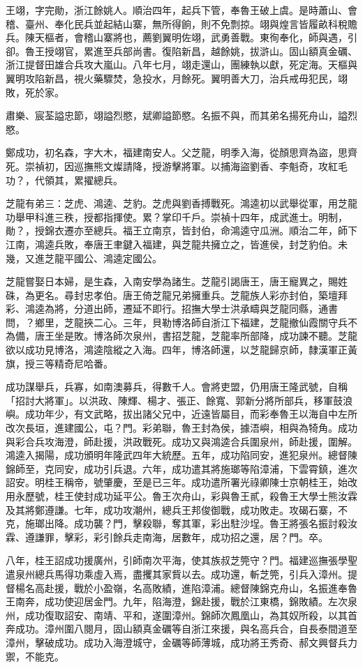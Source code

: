 \begin{pinyinscope}
王翊，字完勛，浙江餘姚人。順治四年，起兵下管，奉魯王破上虞。是時蕭山、會稽、臺州、奉化民兵並起結山寨，無所得餉，則不免剽掠。翊與煌言皆履畝科稅贍兵。陳天樞者，會稽山寨將也，薦劉翼明佐翊，武勇善戰。東徇奉化，師與遇，引卻。魯王授翊官，累進至兵部尚書。復陷新昌，越餘姚，拔滸山。固山額真金礪、浙江提督田雄合兵攻大嵐山。八年七月，翊走還山，團練執以獻，死定海。天樞與翼明攻陷新昌，視火藥驟焚，急投水，月餘死。翼明善大刀，治兵戒毋犯民，翊敗，死於家。

肅樂、宸荃謚忠節，翊謚烈愍，斌卿謚節愍。名振不與，而其弟名揚死舟山，謚烈愍。

鄭成功，初名森，字大木，福建南安人。父芝龍，明季入海，從顏思齊為盜，思齊死。崇禎初，因巡撫熊文燦請降，授游擊將軍。以捕海盜劉香、李魁奇，攻紅毛功？，代領其，累擢總兵。

芝龍有弟三：芝虎、鴻逵、芝豹。芝虎與劉香搏戰死。鴻逵初以武舉從軍，用芝龍功舉甲科進三秩，授都指揮使。累？掌印千戶。崇禎十四年，成武進士。明制，勛？，授錦衣遷亦至總兵。福王立南京，皆封伯，命鴻逵守瓜洲。順治二年，師下江南，鴻逵兵敗，奉唐王聿鍵入福建，與芝龍共擁立之，皆進侯，封芝豹伯。未幾，又進芝龍平國公、鴻逵定國公。

芝龍嘗娶日本婦，是生森，入南安學為諸生。芝龍引謁唐王，唐王寵異之，賜姓硃，為更名。尋封忠孝伯。唐王倚芝龍兄弟擁重兵。芝龍族人彩亦封伯，築壇拜彩、鴻逵為將，分道出師，遷延不即行。招撫大學士洪承疇與芝龍同縣，通書問，？鄉里，芝龍挾二心。三年，貝勒博洛師自浙江下福建，芝龍撤仙霞關守兵不為備，唐王坐是敗。博洛師次泉州，書招芝龍，芝龍率所部降，成功諫不聽。芝龍欲以成功見博洛，鴻逵陰縱之入海。四年，博洛師還，以芝龍歸京師，隸漢軍正黃旗，授三等精奇尼哈番。

成功謀舉兵，兵寡，如南澳募兵，得數千人。會將吏盟，仍用唐王隆武號，自稱「招討大將軍」。以洪政、陳輝、楊才、張正、餘寬、郭新分將所部兵，移軍鼓浪嶼。成功年少，有文武略，拔出諸父兄中，近遠皆屬目，而彩奉魯王以海自中左所改次長垣，進建國公，屯？門。彩弟聯，魯王封為侯，據浯嶼，相與為犄角。成功與彩合兵攻海澄，師赴援，洪政戰死。成功又與鴻逵合兵圍泉州，師赴援，圍解。鴻逵入揭陽，成功頒明年隆武四年大統歷。五年，成功陷同安，進犯泉州。總督陳錦師至，克同安，成功引兵退。六年，成功遣其將施瑯等陷漳浦，下雲霄鎮，進次詔安。明桂王稱帝，號肇慶，至是已三年。成功遣所署光祿卿陳士京朝桂王，始改用永歷號，桂王使封成功延平公。魯王次舟山，彩與魯王貳，殺魯王大學士熊汝霖及其將鄭遵謙。七年，成功攻潮州，總兵王邦俊御戰，成功敗走。攻碣石寨，不克，施瑯出降。成功襲？門，擊殺聯，奪其軍，彩出駐沙埕。魯王將張名振討殺汝霖、遵謙罪，擊彩，彩引餘兵走南海，居數年，成功招之還，居？門。卒。

八年，桂王詔成功援廣州，引師南次平海，使其族叔芝筦守？門。福建巡撫張學聖遣泉州總兵馬得功乘虛入焉，盡攫其家貲以去。成功還，斬芝筦，引兵入漳州。提督楊名高赴援，戰於小盈嶺，名高敗績，進陷漳浦。總督陳錦克舟山，名振進奉魯王南奔，成功使迎居金門。九年，陷海澄，錦赴援，戰於江東橋，錦敗績。左次泉州，成功復取詔安、南靖、平和，遂圍漳州。錦師次鳳凰山，為其奴所殺，以其首奔成功。漳州圍八閱月，固山額真金礪等自浙江來援，與名高兵合，自長泰間道至漳州，擊破成功。成功入海澄城守，金礪等師薄城，成功將王秀奇、郝文興督兵力禦，不能克。


\end{pinyinscope}
